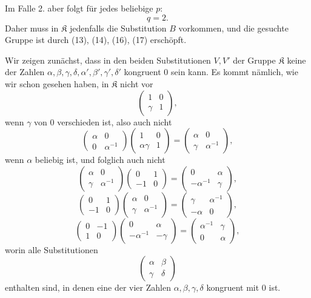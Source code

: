 \documentclass[11pt]{article}
\providecommand{\Kgrp}{\mathfrak K}
\begin{document}
Im Falle 2. aber folgt für jedes beliebige $p$:
\[
 q=2.
\]
Daher muss in $\Kgrp$ jedenfalls die Substitution $B$ vorkommen, und die gesuchte Gruppe ist durch (13), (14), (16), (17) erschöpft.

Wir zeigen zunächst, dass in den beiden Substitutionen $V,V'$ der Gruppe $\Kgrp$ keine der Zahlen $\alpha,\beta,\gamma,\delta,\alpha',\beta',\gamma',\delta'$ kongruent $0$ sein kann. Es kommt nämlich, wie wir schon gesehen haben, in $\Kgrp$ nicht vor
\[
 \begin{pmatrix}1&0\\ \gamma&1\end{pmatrix},
\]
wenn $\gamma$ von $0$ verschieden ist, also auch nicht
\[
 \begin{pmatrix}\alpha&0\\0&\alpha^{-1}\end{pmatrix}
 \begin{pmatrix}1&0\\ \alpha\gamma&1\end{pmatrix}
 =
 \begin{pmatrix}\alpha&0\\ \gamma&\alpha^{-1}\end{pmatrix},
\]
wenn $\alpha$ beliebig ist, und folglich auch nicht
\[
 \begin{pmatrix}\alpha&0\\ \gamma&\alpha^{-1}\end{pmatrix}
 \begin{pmatrix}0&1\\-1&0\end{pmatrix}
 =
 \begin{pmatrix}0&\alpha\\-\alpha^{-1}&\gamma\end{pmatrix},
\]
\[
 \begin{pmatrix}0&1\\-1&0\end{pmatrix}
 \begin{pmatrix}\alpha&0\\ \gamma&\alpha^{-1}\end{pmatrix}
 =
 \begin{pmatrix}\gamma&\alpha^{-1}\\-\alpha&0\end{pmatrix},
\]
\[
 \begin{pmatrix}0&-1\\1&0\end{pmatrix}
 \begin{pmatrix}0&\alpha\\-\alpha^{-1}&-\gamma\end{pmatrix}
 =
 \begin{pmatrix}\alpha^{-1}&\gamma\\0&\alpha\end{pmatrix},
\]
worin alle Substitutionen
\[
 \begin{pmatrix}\alpha&\beta\\ \gamma&\delta\end{pmatrix}
\]
enthalten sind, in denen eine der vier Zahlen $\alpha,\beta,\gamma,\delta$ kongruent mit $0$ ist.
\end{document}

